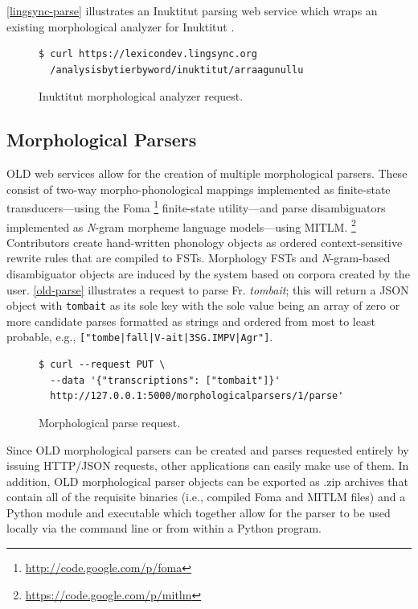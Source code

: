 \documentclass[11pt]{article}
\begin{document}
\autoref{lingsync-parse} illustrates an Inuktitut parsing web service which wraps an existing
morphological analyzer for Inuktitut \cite{Farley:2012:Online}.


\begin{figure}[h]
\scriptsize
\begin{verbatim}
$ curl https://lexicondev.lingsync.org
  /analysisbytierbyword/inuktitut/arraagunullu
\end{verbatim}
\normalsize
\caption{Inuktitut morphological analyzer request.}
\label{lingsync-parse}
\end{figure}



\subsection{Morphological Parsers}

OLD web services allow for the creation of multiple morphological parsers.
These consist of two-way morpho-phonological mappings implemented as
finite-state transducers---using the Foma%
\footnote{\url{http://code.google.com/p/foma}} %
finite-state utility---and parse disambiguators implemented as \textit{N}-gram
morpheme language models---using MITLM.%
\footnote{\url{https://code.google.com/p/mitlm}}
Contributors create hand-written phonology objects as ordered context-sensitive
rewrite rules that are compiled to FSTs. Morphology FSTs and \textit{N}-gram-based
disambiguator objects are induced by the system based on corpora created by the 
user. \autoref{old-parse} illustrates a request to parse Fr. \textit{tombait};
this will return a JSON object with \texttt{tombait} as its sole key with the 
sole value being an array of zero or more candidate parses formatted as strings and 
ordered from most to least probable, e.g., \texttt{["tombe|fall|V-ait|3SG.IMPV|Agr"]}.

\begin{figure}[h]
\scriptsize
\begin{verbatim}
$ curl --request PUT \
  --data '{"transcriptions": ["tombait"]}'
  http://127.0.0.1:5000/morphologicalparsers/1/parse'
\end{verbatim}
\normalsize
\caption{Morphological parse request.}
\label{old-parse}
\end{figure}

Since OLD morphological parsers can be created and parses requested entirely by
issuing HTTP/JSON requests, other applications can easily make use of them. In
addition, OLD morphological parser objects can be exported as .zip archives
that contain all of the requisite binaries (i.e., compiled Foma and MITLM
files) and a Python module and executable which together allow for the parser
to be used locally via the command line or from within a Python program.
\end{document}
